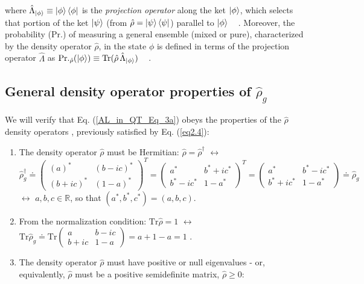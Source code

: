 \documentclass[11pt]{article}
\numberwithin{equation}{section} %
\numberwithin{figure}{section} %
\begin{document}
\begin{appendices}
where $\hat{\Lambda}_{\ket{\phi}}\equiv\ket{\phi}\bra{\phi}$ is the \emph{projection operator} along the ket $\ket{\phi}$, which selects that portion of the ket $\ket{\psi}$ (from $\hat{\rho}=\ket{\psi}\bra{\psi}$) parallel to $\ket{\phi}$  $\,\,\,$ \cite[p.~19, Eq.~(1.3.15)]{Sakurai}. Moreover, the probability ($\textrm{Pr.}$) of measuring a general ensemble (mixed or pure), characterized by the density operator $\hat{\rho}$, in the state $\phi$ is defined in terms of the projection operator $\hat{\Lambda}$ as $\textrm{Pr.}_{\hat{\rho}}(\ket{\phi})\equiv \textrm{Tr}(\hat{\rho}\,\hat{\Lambda}_{\ket{\phi}})$ $\,\,\,$  \cite[p.~134, l.~4]{Shankar}\cite[p.~102, Eq.~(2.159)]{Nielsen}.


\subsection{General density operator properties of $\hat{\rho}_g$}  \label{rho_g_properties}

We will verify that Eq. (\ref{AL_in_QT_Eq_3a}) obeys the properties of the $\hat{\rho}$ density operators \cite[p.~134, Eq.~(4.2.23.1-3)]{Shankar}, previously satisfied by Eq. (\ref{eq2.4}):

\begin{enumerate}
\item The density operator $\hat{\rho}$ must be Hermitian: $\hat{\rho}=\hat{\rho}^\dagger$ $\leftrightarrow$ $\hat{\rho}_g^\dagger\doteq \begin{pmatrix} (a)^*&(b-ic)^* \\ (b+ic)^*&(1-a)^* \end{pmatrix}^T=\begin{pmatrix} a^*&b^*+ic^* \\ b^*-ic^*&1-a^* \end{pmatrix}^T =\begin{pmatrix} a^*&b^*-ic^* \\ b^*+ic^*&1-a^* \end{pmatrix}\doteq\hat{\rho}_g$ $\leftrightarrow$ $a,b,c\in\mathbb{R}$, so that $(a^*,b^*,c^*)=(a,b,c)$. 
\item From the normalization condition: $\textrm{Tr}\hat{\rho}=1$ $\leftrightarrow$  $\textrm{Tr}\hat{\rho}_g\doteq \textrm{Tr}\begin{pmatrix}a&b-ic\\b+ic&1-a\end{pmatrix}=a+1-a=1$ .
\item The density operator $\hat{\rho}$ must have positive or null eigenvalues - or, equivalently, $\hat{\rho}$ must be a positive semidefinite matrix, $\hat{\rho}\geq 0$:\\


\end{enumerate}
\end{appendices}
\end{document}
